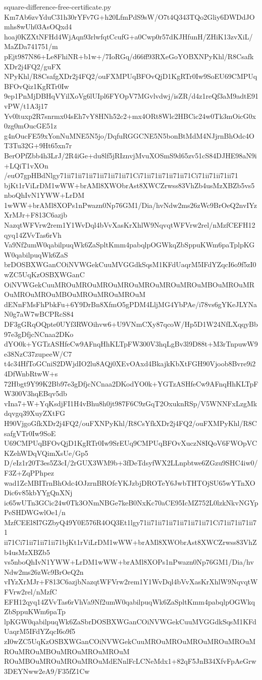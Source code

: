 \documentclass[11pt]{article}
\theoremstyle{definition}
\theoremstyle{remark}
\begin{document}
\begin{filecontents*}[overwrite]{square-difference-free-certificate.py}
Km7Ab6zvYduC31h30rYFv7G+h20LfmPdS9sW/O7t4Q343TQo2Gliy6DWDdJOmhs8wUh03AsOQxd4
hoaj0KZXtNFHd4WjAqn93rlwfqtCcufG+a0Cwp0r57dKJHfunH/ZHiK13zvXiL/MaZDa741751/m
pEjt987N86+Le8FhiNR+b1w+/7IoRGq/d66ff93RXeGoYOBXNPyKhl/R8CsafkXDr2j4FQ2/guFX
NPyKhl/R8CsafgXDr2j4FQ2/ouFXMPUqBFOvQjD1KgRTr0Iw9SoEU69CMPUqBFOvQiz1KgRTr0Iw
9ep1PnMjDBHqVYilXoVg6lUIpl6FYOpV7MGvlvdwj/isZR/d4z1reQf3aM9adtE91vPW/t1A3j17
Yv0ltuxp2R7snrmx04sEh7vY8HNh52c2+mx4ORt8Wlc2HBCic24w0Tk3mOicG0x0zg0mOucGE51z
g4nOucFE59xYonNuMNE5N5jo/DqfuRGGCNE5N5bonBtMdM4NJjrnBhOdc4OT3Tu32G+9Ht65xn7r
BerOPfZbb4h3LrJ/2R4iGe+du8lf5jRIznvjMvuXOSmS9d65zv51cS84DJHE98aN9i+LQiT1vXOn
/euO7gpHBdNlgy71ii71ii71ii71ii71ii71ii71Ci71ii71ii71ii71ii71Ci71ii71ii71ii71
bjKt1rViLrDM1wWW+brAMl8XWObrAst8XWCZrwss83VhZb4usMzXBZb5vs5nboQhIvN1YWW+LrDM
1wWW+brAMl8XOPs1nPwazn0Np76GM1/Dia/hvNdw2ms26zWc9BrOeQ2nvIYzXrMJr+F813C6azjb
NazqtWFVrw2rem1Y1WvDql4bVvXasKrXhlW9NqvqtWFVrw2rel/nMzfCEFH12qyq14ZVvTas6rVh
Va9Nf2umW0qabilpuqWk6ZaSpltKmm4pabqlpOGWkqZbSppuKWm6paTplpKGW0qabilpuqWk6ZaS
brDOSBXWGanCOiNVWGekCuuMVGGdkSqsM1KFdUaqrM5IFdYZqcI6o9f5zI0wZC5UqKzOSBXWGanC
OiNVWGekCuuMROuMROuMROuMROuMROuMROuMROuMBOuMROuMROuMROuMROuMBOuMROuMROuMROuM
dENnFMsFhPbkFu+6Y9DrBn8XfmO5gPDM4LljMG4YbPAe/i78vs6gYKeJLYNaN0g7aW7wBCPRcS84
DF3gGRqOQpte0UYf3RWOihvw6+U9VNmCXy87qcoW/Hp5D1W24NfLXqqyBb97e3gDfjcNCnaa2DKo
dYO0k+YGTzASHfeCw9AFnqHhKLTpFW300V3hqLgBv3l9D88t+M3rTnpuwW9e38NzC37zupeeW/C7
t4c34HfToGCniS2DWjdIO2lu8AQj0XEvOAxd4BkajkKbXtFGH90Vjoob8Bvre9i24DfWnbRtwW+s
72Hbgt9Y99K2Bb97e3gDfjcNCnaa2DKodYO0k+YGTzASHfeCw9AFnqHhKLTpFW300V3hqEBqv5db
vIna7+W+YqKsdjFI1H4vBhu8h0jt987F6C9zGqT2OxuknRSp/V5WNNFxLzgMkdqvgq39XuyZXtFG
H90VjgoGfkXDr2j4FQ2/ouFXNPyKhl/R8CsYfkXDr2j4FQ2/ouFXMPyKhl/R8CsafgVTr0Iw9SoE
U69CMPUqBFOvQjD1KgRTr0Iw9SrEUq9CMPUqBFOvXuczN8IQoV6FWOpVCKZehWDqVQimXsUe/Gp5
D/eIz1r20T3es5Z3cI/2rGUX3WM9b+3fDeTdsyfWX2LLnpbtwe6ZGzu9SHC4iw0/F3Z+ZqPPhpez
wad1ZcMBITrnBhOdc4OJzrnBROfcYKJzbjDROTeY6JwbTHTOjSU65wYTnXODic6v85kbYYgQnXNj
ic65wUTn3GCic24w0Tk3ONmNBGe7keB0NxKc70aCE95IcMZ752L0lzkNkvNGYpPeSHDWGwlOe1/n
MzfCEEl8I7GZbyQ49Y0E576R4OQ3Et1lgy71ii71ii71ii71ii71ii71ii71Ci71ii71ii71ii71
ii71Ci71ii71ii71ii71bjKt1rViLrDM1wWW+brAMl8XWObrAst8XWCZrwss83VhZb4usMzXBZb5
vs5nboQhIvN1YWW+LrDM1wWW+brAMl8XOPs1nPwazn0Np76GM1/Dia/hvNdw2ms26zWc9BrOeQ2n
vIYzXrMJr+F813C6azjbNazqtWFVrw2rem1Y1WvDql4bVvXasKrXhlW9NqvqtWFVrw2rel/nMzfC
EFH12qyq14ZVvTas6rVhVa9Nf2umW0qabilpuqWk6ZaSpltKmm4pabqlpOGWkqZbSppuKWm6paTp
lpKGW0qabilpuqWk6ZaSbrDOSBXWGanCOiNVWGekCuuMVGGdkSqsM1KFdUaqrM5IFdYZqcI6o9f5
zI0wZC5UqKzOSBXWGanCOiNVWGekCuuMROuMROuMROuMROuMROuMROuMROuMBOuMROuMROuMROuM
ROuMBOuMROuMROuMROuMdENnlFcLCNeMdx1+82qF5JnB34XfvFpAeGrw3DEYNww2eA9/F35fZ1Cw

\end{filecontents*}
\end{document}
